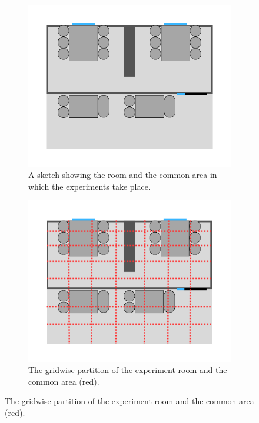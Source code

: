 \begin{figure}
    \centering
    \begin{subfigure}[b]{0.48\textwidth}
        \centering
        \includegraphics[width=\textwidth]{images/experiment_room.png}
        \caption{A sketch showing the room and the common area in which the experiments take place.}
        \label{fig:experiment_room}
    \end{subfigure}
    \begin{subfigure}[b]{0.48\textwidth}
        \centering
        \includegraphics[width=\textwidth]{images/roomwithgrid.png}
        \caption{The gridwise partition of the experiment room and the common area (red).}

\end{subfigure}
\end{figure}
